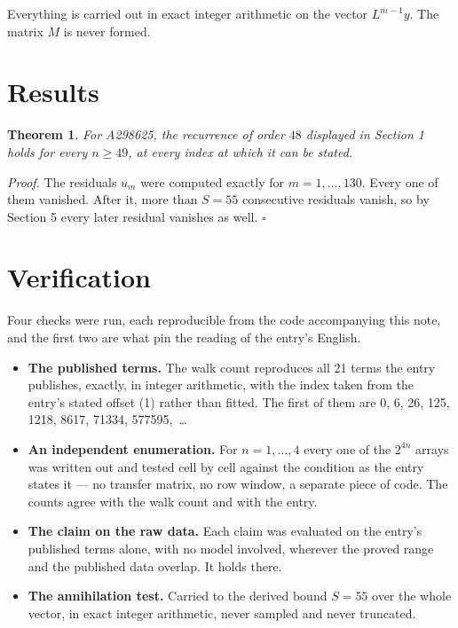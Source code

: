 \documentclass[11pt]{article}
\newtheorem{theorem}{Theorem}
\theoremstyle{definition}
\begin{document}
Everything is carried out in exact integer arithmetic on the vector $L^{m-1}y$. The matrix $M$ is never formed.

\section{Results}

\begin{theorem} For A298625, the recurrence of order $48$ displayed in Section 1 holds for every $n \ge 49$, at every index at which it can be stated.\end{theorem}

{\itshape Proof.} The residuals $u_m$ were computed exactly for $m = 1,\dots,130$. Every one of them vanished. After it, more than $S = 55$ consecutive residuals vanish, so by Section 5 every later residual vanishes as well. $\square$

\section{Verification}

Four checks were run, each reproducible from the code accompanying this note, and the first two are what pin the reading of the entry's English.

\begin{itemize}

\item {\bfseries The published terms.} The walk count reproduces all 21 terms the entry publishes, exactly, in integer arithmetic, with the index taken from the entry's stated offset (1) rather than fitted. The first of them are 0, 6, 26, 125, 1218, 8617, 71334, 577595,~\dots

\item {\bfseries An independent enumeration.} For $n = 1,\dots,4$ every one of the $2^{4n}$ arrays was written out and tested cell by cell against the condition as the entry states it --- no transfer matrix, no row window, a separate piece of code. The counts agree with the walk count and with the entry.

\item {\bfseries The claim on the raw data.} Each claim was evaluated on the entry's published terms alone, with no model involved, wherever the proved range and the published data overlap. It holds there.

\item {\bfseries The annihilation test.} Carried to the derived bound $S = 55$ over the whole vector, in exact integer arithmetic, never sampled and never truncated.

\end{itemize}
\end{document}
